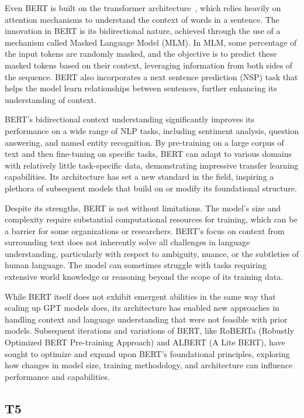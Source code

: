 Even BERT is built on the transformer architecture~\cite{vaswani2023attention}, which relies heavily on attention mechanisms to understand the context of words in a sentence.
The innovation in BERT is its bidirectional nature, achieved through the use of a mechanism called Masked Language Model (MLM). In MLM, some percentage of the input tokens are randomly masked, and the objective is to predict these masked tokens based on their context, leveraging information from both sides of the sequence.
BERT also incorporates a next sentence prediction (NSP) task that helps the model learn relationships between sentences, further enhancing its understanding of context.

BERT's bidirectional context understanding significantly improves its performance on a wide range of NLP tasks, including sentiment analysis, question answering, and named entity recognition.
By pre-training on a large corpus of text and then fine-tuning on specific tasks, BERT can adapt to various domains with relatively little task-specific data, demonstrating impressive transfer learning capabilities.
Its architecture has set a new standard in the field, inspiring a plethora of subsequent models that build on or modify its foundational structure.

Despite its strengths, BERT is not without limitations.
The model's size and complexity require substantial computational resources for training, which can be a barrier for some organizations or researchers.
BERT's focus on context from surrounding text does not inherently solve all challenges in language understanding, particularly with respect to ambiguity, nuance, or the subtleties of human language.
The model can sometimes struggle with tasks requiring extensive world knowledge or reasoning beyond the scope of its training data.

While BERT itself does not exhibit emergent abilities in the same way that scaling up GPT models does, its architecture has enabled new approaches in handling context and language understanding that were not feasible with prior models.
Subsequent iterations and variations of BERT, like RoBERTa (Robustly Optimized BERT Pre-training Approach) and ALBERT (A Lite BERT), have sought to optimize and expand upon BERT's foundational principles, exploring how changes in model size, training methodology, and architecture can influence performance and capabilities.

\subsection{T5}
\label{subsec:t5}

